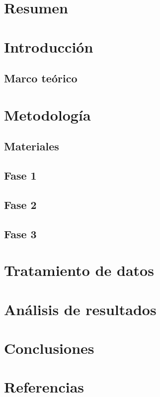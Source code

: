\documentclass[spanish,notitlepage,letterpaper, 12pt]{article}
\begin{document}

\tableofcontents

\newpage

\section{Resumen}

\section{Introducción}

\subsection{Marco teórico} \label{I.MT}
\section{Metodología}
\subsection{Materiales}
\subsection{Fase 1}
\subsection{Fase 2}
\subsection{Fase 3}
\section{Tratamiento de datos} \label{TD}
\section{Análisis de resultados}
\section{Conclusiones}
\section{Referencias} 


\end{document}
